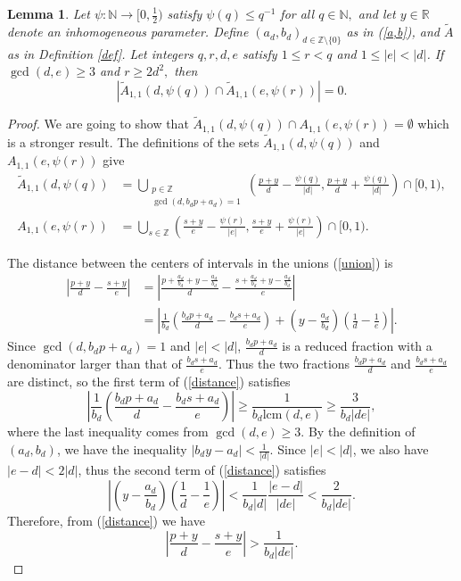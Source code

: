 \documentclass[reqno]{amsart}
\newtheorem{lemma}{Lemma}
\theoremstyle{definition}
\theoremstyle{remark}
\begin{document}
\begin{lemma}\label{mainlemma}
    Let $\psi: \mathbb{N} \to [0,\frac{1}{2})$ satisfy $\psi(q) \leq q^{-1}$ for all $q \in \mathbb{N},$ and let $y \in \mathbb{R}$ denote an inhomogeneous parameter. Define $(a_d,b_d)_{d \in \mathbb{Z} \setminus \{0\}}$ as in (\ref{a,b}), and  $\tilde{A}$ as in Definition \ref{def}. Let integers $q,r,d,e$ satisfy $1\leq r < q$ and $1\leq |e| < |d|$. If $\gcd(d,e) \geq 3$ and $r \geq 2d^2,$ then
    $$|\tilde A_{1,1} (d, \psi(q)) \cap \tilde A_{1,1}(e, \psi(r))| = 0.$$
\end{lemma}
\begin{proof}
    We are going to show that $\tilde A_{1,1} (d, \psi(q)) \cap A_{1,1}(e, \psi(r)) = \emptyset$ which is a stronger result. The definitions of the sets $\tilde A_{1,1}(d, \psi(q))$ and $A_{1,1}(e, \psi(r))$ give
    \begin{equation}\label{union}
        \begin{aligned}
            \tilde A_{1,1}(d, \psi(q)) &= \bigcup_{\substack{p \in \mathbb{Z}\\ \gcd(d, b_d p + a_d)=1}} \left(\frac{p+y}{d} -\frac{\psi(q)}{|d|}, \frac{p+y}{d} + \frac{\psi(q)}{|d|} \right) \cap [0,1),\\
            A_{1,1}(e, \psi(r)) &= \bigcup_{s \in \mathbb{Z}} \left(\frac{s+y}{e} - \frac{\psi(r)}{|e|}, \frac{s+y}{e} + \frac{\psi(r)}{|e|} \right) \cap [0,1).
        \end{aligned}
    \end{equation}
    
    The distance between the centers of intervals in the unions (\ref{union}) is
    \begin{align}\label{distance}
        \left| \frac{p+y}{d} - \frac{s+y}{e} \right| &= \left| \frac{p+ \frac{a_d}{b_d} +y -\frac{a_d}{b_d}}{d} - \frac{s+ \frac{a_d}{b_d} + y - \frac{a_d}{b_d}}{e} \right| \nonumber \\
        &= \left| \frac{1}{b_d} \left(\frac{b_d p + a_d}{d} - \frac{b_d s + a_d}{e} \right) + \left(y - \frac{a_d}{b_d} \right) \left(\frac{1}{d} - \frac{1}{e} \right)\right|.
    \end{align}
    Since $\gcd(d, b_d p+a_d) = 1$ and $|e| < |d|$, $\frac{b_d p+a_d}{d}$ is a reduced fraction with a denominator larger than that of $\frac{b_d s+a_d}{e}.$ Thus the two fractions $\frac{b_d p+a_d}{d}$ and $\frac{b_d s+a_d}{e}$ are distinct, so the first term of (\ref{distance}) satisfies
    $$\left| \frac{1}{b_d} \left(\frac{b_d p + a_d}{d} - \frac{b_d s + a_d}{e} \right) \right| \geq \frac{1}{b_d \text{lcm}(d,e)} \geq \frac{3}{b_d |de|},$$
    where the last inequality comes from $\gcd(d,e) \geq 3$. By the definition of $(a_d,b_d)$, we have the inequality $|b_d y - a_d| < \frac{1}{|d|}$. Since $|e|<|d|$, we also have $|e-d|<2|d|$, thus the second term of (\ref{distance}) satisfies
    $$\left|\left(y - \frac{a_d}{b_d} \right) \left(\frac{1}{d} - \frac{1}{e} \right)\right| < \frac{1}{b_d|d|} \frac{|e-d|}{|de|} < \frac{2}{b_d |de|}.$$
    Therefore, from (\ref{distance}) we have
    $$\left| \frac{p+y}{d} - \frac{s+y}{e} \right| > \frac{1}{b_d |de|}.$$


\end{proof}
\end{document}
